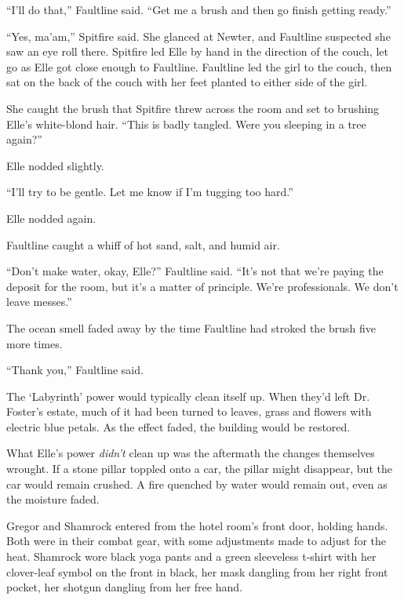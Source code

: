 ``I'll do that,'' Faultline said.  ``Get me a brush and then go finish getting ready.''



``Yes, ma'am,'' Spitfire said.  She glanced at Newter, and Faultline suspected she saw an eye roll there.  Spitfire led Elle by hand in the direction of the couch, let go as Elle got close enough to Faultline.  Faultline led the girl to the couch, then sat on the back of the couch with her feet planted to either side of the girl.



She caught the brush that Spitfire threw across the room and set to brushing Elle's white-blond hair.  ``This is badly tangled.  Were you sleeping in a tree again?''



Elle nodded slightly.



``I'll try to be gentle.  Let me know if I'm tugging too hard.''



Elle nodded again.



Faultline caught a whiff of hot sand, salt, and humid air.



``Don't make water, okay, Elle?''  Faultline said.  ``It's not that we're paying the deposit for the room, but it's a matter of principle.  We're professionals.  We don't leave messes.''



The ocean smell faded away by the time Faultline had stroked the brush five more times.



``Thank you,'' Faultline said.



The `Labyrinth' power would typically clean itself up.  When they'd left Dr. Foster's estate, much of it had been turned to leaves, grass and flowers with electric blue petals.  As the effect faded, the building would be restored.



What Elle's power \emph{didn't} clean up was the aftermath the changes themselves wrought.  If a stone pillar toppled onto a car, the pillar might disappear, but the car would remain crushed.  A fire quenched by water would remain out, even as the moisture faded.



Gregor and Shamrock entered from the hotel room's front door, holding hands.  Both were in their combat gear, with some adjustments made to adjust for the heat.  Shamrock wore black yoga pants and a green sleeveless t-shirt with her clover-leaf symbol on the front in black, her mask dangling from her right front pocket, her shotgun dangling from her free hand.




